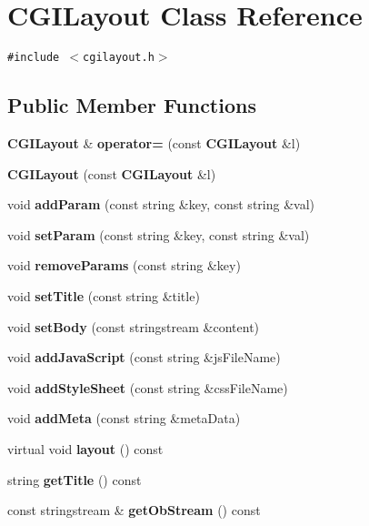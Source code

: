 \section{CGILayout Class Reference}
\label{classCGILayout}
{\tt \#include $<$cgilayout.h$>$}

\subsection*{Public Member Functions}
\begin{CompactItemize}
\item 
{\bf CGILayout} \& \textbf{operator=} (const {\bf CGILayout} \&l)\label{classCGILayout_c5bd73276fedd502cf3867b8151cade9}

\item 
\textbf{CGILayout} (const {\bf CGILayout} \&l)\label{classCGILayout_b059968bd99bd649d2ac56d73a959119}

\item 
void \textbf{addParam} (const string \&key, const string \&val)\label{classCGILayout_6ad5855339cd0b5d11c2529e098d9318}

\item 
void \textbf{setParam} (const string \&key, const string \&val)\label{classCGILayout_9cf8e286bb4192ef383f3c64f5689f0e}

\item 
void \textbf{removeParams} (const string \&key)\label{classCGILayout_e7403053e136c59c254a9f3378955073}

\item 
void \textbf{setTitle} (const string \&title)\label{classCGILayout_75332461392d86dea747caa244da583c}

\item 
void {\bf setBody} (const stringstream \&content)
\item 
void \textbf{addJavaScript} (const string \&jsFileName)\label{classCGILayout_a00ddbb5c9f0a1bdfa7ef2dcd0b02f5a}

\item 
void \textbf{addStyleSheet} (const string \&cssFileName)\label{classCGILayout_c6439bbf4dff84cd53d8f64af72f9c60}

\item 
void \textbf{addMeta} (const string \&metaData)\label{classCGILayout_5bb0e152e9bdba636bf45c279646f1fe}

\item 
virtual void \textbf{layout} () const \label{classCGILayout_1715d991cc1d1bc3fe997fd63df9ea2d}

\item 
string \textbf{getTitle} () const \label{classCGILayout_ceefb16d8a21fda1ea88463d4f19a081}

\item 
const stringstream \& \textbf{getObStream} () const \label{classCGILayout_6b074c717d707283cec5b38e59ba3be1}

\end{CompactItemize}

